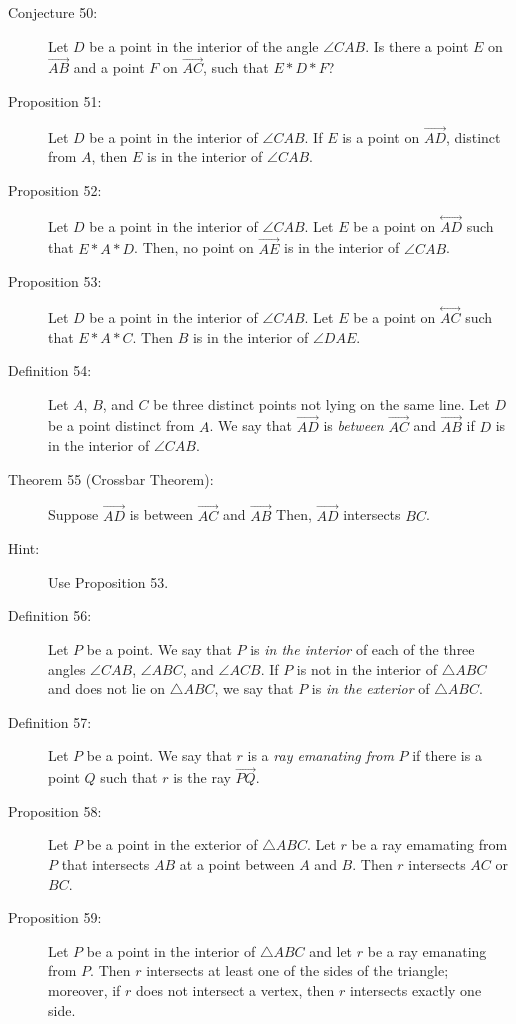 \documentclass{article}
\newcommand{\linethrough}[1]{\stackrel{\longleftrightarrow}{#1} }
\newcommand{\ray}[1]{\stackrel{\longrightarrow}{#1} }
\begin{document}
\begin{description}

\item[Conjecture 50:] Let $D$ be a point in the interior of the angle $\angle CAB$. Is there a point $E$ on $\ray{AB}$ and a point $F$ on $\ray{AC}$, such that $E*D*F$?

\item[Proposition 51:] Let $D$ be a point in the interior of $\angle CAB$. If $E$ is a point on $\ray{AD}$, distinct from $A$, then $E$ is in the interior of $\angle CAB$.

\item[Proposition 52:] Let $D$ be a point in the interior of $\angle CAB$. Let $E$ be a point on $\linethrough{AD}$ such that $E*A*D$. Then, no point on $\ray{AE}$ is in the interior of $\angle CAB$.

\item[Proposition 53:] Let $D$ be a point in the interior of $\angle CAB$. Let $E$ be a point on $\linethrough{AC}$ such that $E*A*C$. Then $B$ is in the interior of $\angle DAE$.

\item[Definition 54:] Let $A$, $B$, and $C$ be three distinct points not lying on the same line. Let $D$ be a point distinct from $A$. We say that $\ray{AD}$ is \emph{between} $\ray{AC}$ and $\ray{AB}$ if $D$ is in the interior of $\angle CAB$.

\item[Theorem 55 (Crossbar Theorem):] Suppose $\ray{AD}$ is between $\ray{AC}$ and $\ray{AB}$ Then, $\ray{AD}$ intersects $BC$.

\item[Hint:] Use Proposition 53.

\item[Definition 56:] Let $P$ be a point. We say that $P$ is \emph{in the interior} of each of the three angles $\angle CAB$, $\angle ABC$, and $\angle ACB$. If $P$ is not in the interior of $\triangle ABC$ and does not lie on $\triangle ABC$, we say that $P$ is \emph{in the exterior} of $\triangle ABC$.

\item[Definition 57:] Let $P$ be a point. We say that $r$ is a \emph{ray emanating from} $P$ if there is a point $Q$ such that $r$ is the ray $\ray{PQ}$.

\item[Proposition 58:] Let $P$ be a point in the exterior of $\triangle ABC$. Let $r$ be a ray emamating from $P$ that intersects $AB$ at a point between $A$ and $B$. Then $r$ intersects $AC$ or $BC$.

\item[Proposition 59:] Let $P$ be a point in the interior of $\triangle ABC$ and let $r$ be a ray emanating from $P$. Then $r$ intersects at least one of the sides of the triangle; moreover, if $r$ does not intersect a vertex, then $r$ intersects exactly one side.

\end{description}
\end{document}
